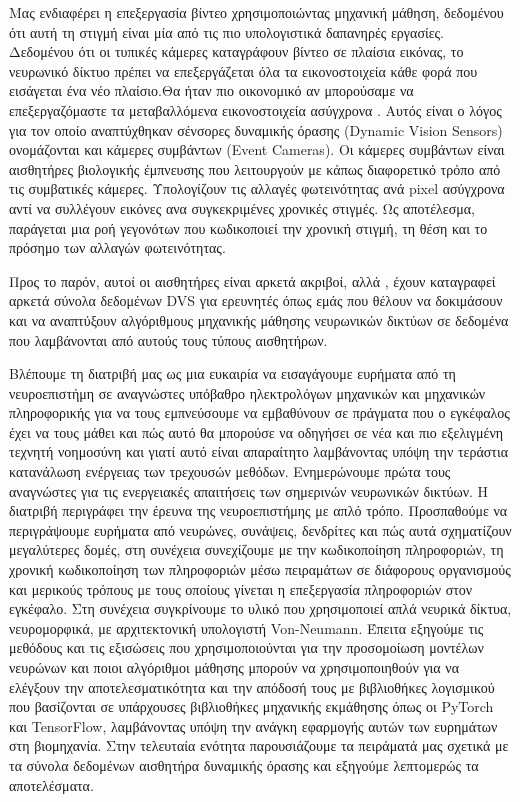 \documentclass[12pt]{report}
\begin{document}
Μας ενδιαφέρει η επεξεργασία βίντεο χρησιμοποιώντας μηχανική μάθηση, δεδομένου ότι αυτή τη στιγμή είναι μία από τις πιο υπολογιστικά δαπανηρές εργασίες. Δεδομένου ότι οι τυπικές κάμερες καταγράφουν βίντεο σε πλαίσια εικόνας, το νευρωνικό δίκτυο πρέπει να επεξεργάζεται όλα τα εικονοστοιχεία κάθε φορά που εισάγεται ένα νέο πλαίσιο.Θα ήταν πιο οικονομικό αν μπορούσαμε να επεξεργαζόμαστε τα μεταβαλλόμενα εικονοστοιχεία ασύγχρονα . Αυτός είναι ο λόγος για τον οποίο αναπτύχθηκαν σένσορες δυναμικής όρασης \textlatin{(Dynamic Vision Sensors)} ονομάζονται και κάμερες συμβάντων \textlatin{(Event Cameras)}. Οι κάμερες συμβάντων είναι αισθητήρες βιολογικής έμπνευσης που λειτουργούν με κάπως διαφορετικό τρόπο από τις συμβατικές κάμερες. Υπολογίζουν τις αλλαγές φωτεινότητας ανά pixel ασύγχρονα αντί να συλλέγουν εικόνες ανα συγκεκριμένες χρονικές στιγμές. Ως αποτέλεσμα, παράγεται μια ροή γεγονότων που κωδικοποιεί την χρονική στιγμή, τη θέση και το πρόσημο των αλλαγών φωτεινότητας.

Προς το παρόν, αυτοί οι αισθητήρες είναι αρκετά ακριβοί, αλλά , έχουν καταγραφεί αρκετά σύνολα δεδομένων \textlatin{DVS} για ερευνητές όπως εμάς που θέλουν να δοκιμάσουν και να αναπτύξουν αλγόριθμους μηχανικής μάθησης νευρωνικών δικτύων σε δεδομένα που λαμβάνονται από αυτούς τους τύπους αισθητήρων.

Βλέπουμε τη διατριβή μας ως μια ευκαιρία να εισαγάγουμε ευρήματα από τη νευροεπιστήμη σε αναγνώστες υπόβαθρο ηλεκτρολόγων μηχανικών και μηχανικών πληροφορικής για να τους εμπνεύσουμε να εμβαθύνουν σε πράγματα που ο εγκέφαλος έχει να τους μάθει και πώς αυτό θα μπορούσε να οδηγήσει σε νέα και πιο εξελιγμένη τεχνητή νοημοσύνη και γιατί αυτό είναι απαραίτητο λαμβάνοντας υπόψη την τεράστια κατανάλωση ενέργειας των τρεχουσών μεθόδων. Ενημερώνουμε πρώτα τους αναγνώστες για τις ενεργειακές απαιτήσεις των σημερινών νευρωνικών δικτύων. Η διατριβή περιγράφει την έρευνα της νευροεπιστήμης με απλό τρόπο. Προσπαθούμε να περιγράψουμε ευρήματα από νευρώνες, συνάψεις, δενδρίτες και πώς αυτά σχηματίζουν μεγαλύτερες δομές, στη συνέχεια συνεχίζουμε με την κωδικοποίηση πληροφοριών, τη χρονική κωδικοποίηση των πληροφοριών μέσω πειραμάτων σε διάφορους οργανισμούς και μερικούς τρόπους με τους οποίους γίνεται η επεξεργασία πληροφοριών στον εγκέφαλο. Στη συνέχεια συγκρίνουμε το υλικό που χρησιμοποιεί απλά νευρικά δίκτυα, νευρομορφικά, με αρχιτεκτονική υπολογιστή  \textlatin{Von-Neumann}. Έπειτα εξηγούμε τις μεθόδους και τις εξισώσεις που χρησιμοποιούνται για την προσομοίωση μοντέλων νευρώνων και ποιοι αλγόριθμοι μάθησης μπορούν να χρησιμοποιηθούν για να ελέγξουν την αποτελεσματικότητα και την απόδοσή τους με βιβλιοθήκες λογισμικού που βασίζονται σε υπάρχουσες βιβλιοθήκες μηχανικής εκμάθησης όπως οι \textlatin{PyTorch} και \textlatin{TensorFlow}, λαμβάνοντας υπόψη την ανάγκη εφαρμογής αυτών των ευρημάτων στη βιομηχανία. Στην τελευταία ενότητα παρουσιάζουμε τα πειράματά μας σχετικά με τα σύνολα δεδομένων αισθητήρα δυναμικής όρασης και εξηγούμε λεπτομερώς τα αποτελέσματα.
\end{document}
